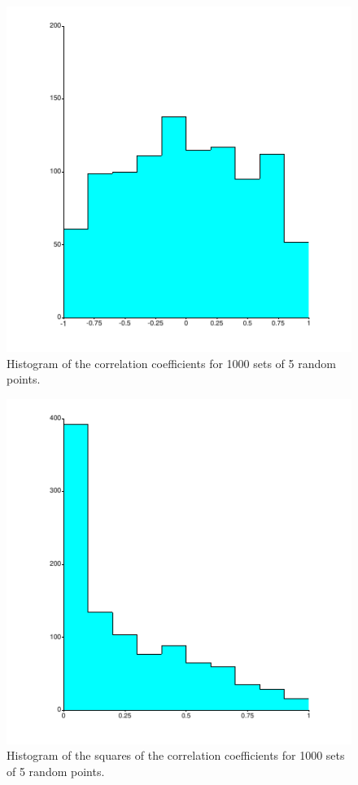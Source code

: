 \documentclass[onecolumn]{article}
\begin{document}
\begin{figure}
\center
\caption{Histogram of the correlation coefficients for 1000 sets of 5 random points.}
\label{histogram}
\includegraphics{histogram_corr.pdf}
\end{figure}

\begin{figure}
\center
\caption{Histogram of the squares of the correlation coefficients for 1000 sets of 5 random points.}
\label{histosquared}
\includegraphics{histogram_squared.pdf}
\end{figure}
\end{document}

